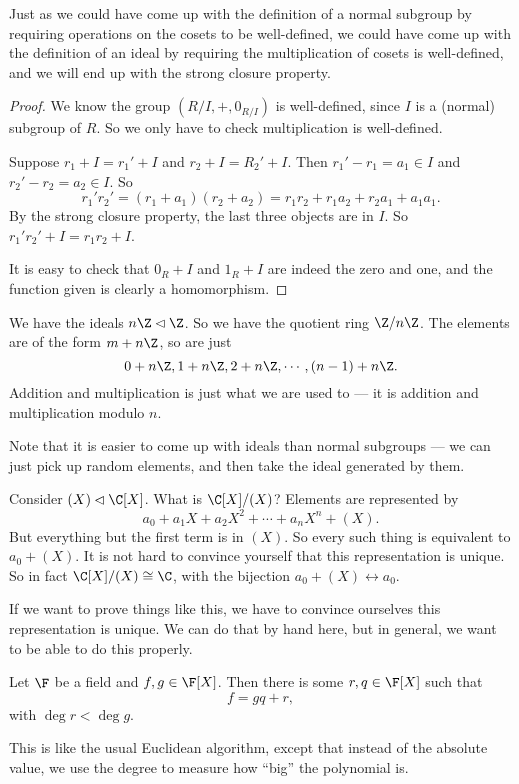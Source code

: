 \documentclass[a4paper]{article}
\begin{document}
Just as we could have come up with the definition of a normal subgroup by requiring operations on the cosets to be well-defined, we could have come up with the definition of an ideal by requiring the multiplication of cosets is well-defined, and we will end up with the strong closure property.

\begin{proof}
  We know the group $(R/I, +, 0_{R/I})$ is well-defined, since $I$ is a (normal) subgroup of $R$. So we only have to check multiplication is well-defined.

  Suppose $r_1 + I = r_1' + I$ and $r_2 + I = R_2' + I$. Then $r_1' - r_1 = a_1 \in I$ and $r_2' - r_2 = a_2 \in I$. So
  \[
    r_1' r_2' = (r_1 + a_1) (r_2 + a_2) = r_1 r_2 + r_1a_2 + r_2a_1 + a_1a_1.
  \]
  By the strong closure property, the last three objects are in $I$. So $r_1' r_2' + I = r_1r_2 + I$.

  It is easy to check that $0_R + I$ and $1_R + I$ are indeed the zero and one, and the function given is clearly a homomorphism.
\end{proof}

\begin{eg}
  We have the ideals $n\Z \lhd \Z$. So we have the quotient ring $\Z / n\Z$. The elements are of the form $m + n\Z$, so are just
  \[
    0 + n\Z, 1 + n\Z, 2 + n\Z, \cdots, (n - 1) + n\Z.
  \]
  Addition and multiplication is just what we are used to --- it is addition and multiplication modulo $n$.
\end{eg}

Note that it is easier to come up with ideals than normal subgroups --- we can just pick up random elements, and then take the ideal generated by them.
\begin{eg}
  Consider $(X) \lhd \C[X]$. What is $\C[X]/(X)$? Elements are represented by
  \[
    a_0 + a_1 X + a_2 X^2 + \cdots + a_n X^n + (X).
  \]
  But everything but the first term is in $(X)$. So every such thing is equivalent to $a_0 + (X)$. It is not hard to convince yourself that this representation is unique. So in fact $\C[X]/(X) \cong \C$, with the bijection $a_0 + (X) \leftrightarrow a_0$.
\end{eg}
If we want to prove things like this, we have to convince ourselves this representation is unique. We can do that by hand here, but in general, we want to be able to do this properly.

\begin{prop}
  Let $\F$ be a field and $f, g \in \F[X]$. Then there is some $r, q \in \F[X]$ such that
  \[
    f = gq + r,
  \]
  with $\deg r < \deg g$.
\end{prop}
This is like the usual Euclidean algorithm, except that instead of the absolute value, we use the degree to measure how ``big'' the polynomial is.
\end{document}

